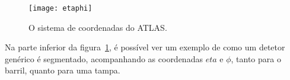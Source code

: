 \begin{figure}
\begin{center}
\texttt{[image: etaphi]}
\end{center}
\caption{O sistema de coordenadas do ATLAS.}
\label{fig:etaphi}
\end{figure}

Na parte inferior da figura~\ref{fig:etaphi}, é possível ver um exemplo de
como um detetor genérico é segmentado, acompanhando as coordenadas $eta$ e
$\phi$, tanto para o barril, quanto para uma tampa.

